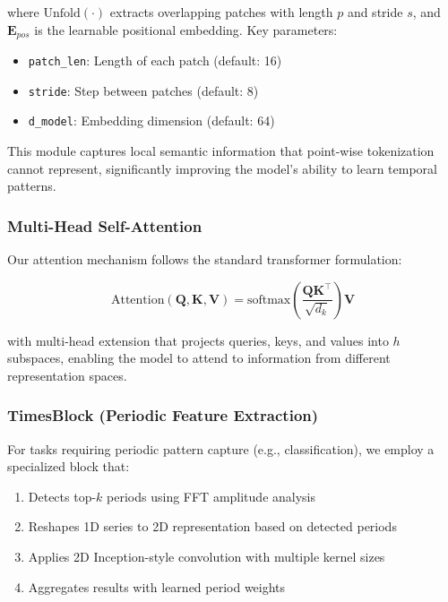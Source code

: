 where $\text{Unfold}(\cdot)$ extracts overlapping patches with length $p$ and stride $s$, and $\mathbf{E}_{pos}$ is the learnable positional embedding. Key parameters:

\begin{itemize}[leftmargin=*, itemsep=1pt]
    \item \texttt{patch\_len}: Length of each patch (default: 16)
    \item \texttt{stride}: Step between patches (default: 8)
    \item \texttt{d\_model}: Embedding dimension (default: 64)
\end{itemize}

This module captures local semantic information that point-wise tokenization cannot represent, significantly improving the model's ability to learn temporal patterns.

\subsubsection{Multi-Head Self-Attention}
\label{appx:mhsa}

Our attention mechanism follows the standard transformer formulation:

\begin{equation}
    \text{Attention}(\mathbf{Q}, \mathbf{K}, \mathbf{V}) = \text{softmax}\left(\frac{\mathbf{Q}\mathbf{K}^\top}{\sqrt{d_k}}\right)\mathbf{V}
\end{equation}

with multi-head extension that projects queries, keys, and values into $h$ subspaces, enabling the model to attend to information from different representation spaces.

\subsubsection{TimesBlock (Periodic Feature Extraction)}
\label{appx:timesblock}

For tasks requiring periodic pattern capture (e.g., classification), we employ a specialized block that:

\begin{enumerate}[leftmargin=*, itemsep=1pt]
    \item Detects top-$k$ periods using FFT amplitude analysis
    \item Reshapes 1D series to 2D representation based on detected periods
    \item Applies 2D Inception-style convolution with multiple kernel sizes
    \item Aggregates results with learned period weights
\end{enumerate}

